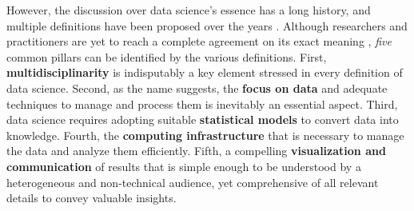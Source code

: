 However, the discussion over data science's essence has a long history, and multiple definitions have been proposed over the years \cite{donoho201750years}.
Although researchers and practitioners are yet to reach a complete agreement on its exact meaning  \cite{ASA2015statement}, \emph{five} common pillars can be identified by the various definitions.
First, \textbf{multidisciplinarity} is indisputably a key element stressed in every definition of data science. 
Second, as the name suggests, the \textbf{focus on data} and adequate techniques to manage and process them is inevitably an essential aspect.
Third, data science requires adopting suitable \textbf{statistical models} to convert data into knowledge.
Fourth, the \textbf{computing infrastructure} that is necessary to manage the data and analyze them efficiently. 
Fifth, a compelling \textbf{visualization and communication} of results that is simple enough to be understood by a heterogeneous and non-technical audience, yet comprehensive of all relevant details to convey valuable insights.


